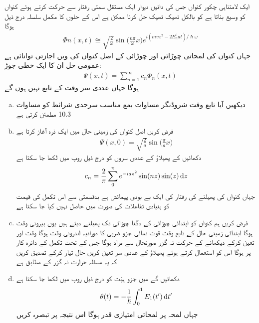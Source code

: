 ایک لامتناہی چکور کنواں جس کی دائیں دیوار ایک مستقل سمتی رفتار  سے حرکت کرتے ہوئے کنواں کو وسیع بناتا ہے کو بالکل ٹھیک ٹھیک حل کرنا ممکن ہے اس کے حلوں کا مکمل سلسلہ درج ذیل ہوگا 
\begin{align}
\Phi n (x, t) \cong \sqrt{\frac{2}{\omega}} \sin \big ( \frac{n \pi}{\omega} x \big ) e^{i(mvx^2 -2E_n^i at)/\hslash \omega}
\end{align}
جہاں  کنواں کی لمحاتی چوڑائی اور چوڑائی  کے اصل کنواں کی  ویں اجازتی توانائی  ہے عمومی حل ان  کا ایک خطی جوڑ:
\begin{align}
\Psi (x, t) = \sum_{n = 1}^{\infty} c_n \Phi_n (x, t)
\end{align}
ہوگا جہاں عددی سر  وقت  کے تابع نہیں ہوں گے 
\begin{enumerate}[a.]
\item
دیکھیں آیا تابع وقت شروڈنگر مساوات بمع مناسب سرحدی شرائط کو مساوات 10.3  مطمئن کرتی ہے 
\item
فرض کریں اصل کنواں کی زمینی حال میں ایک ذرہ آغاز   کرتا ہے  
\begin{align*}
\Psi (x, 0) = \sqrt{\frac{2}{a}} \sin \big ( \frac{\pi}{a} x \big )
\end{align*}
دکھائیں کے پھیلاؤ کے عددى سروں کو درج ذیل روپ میں لکھا جا سکتا ہے 
\begin{align}
c_n = \frac{2}{\pi} \sum_0^{\pi} e^{-iaz^2} \sin(nz) \sin(z) \dif z
\end{align}
جہاں 
کنواں کی پھیلنے کی رفتار کی ایک بے بودی پیمائش ہے بدقسمتی سے اس تکمل کی قیمت کو بنیادی تفاعلات کی صورت میں حاصل نہیں کیا جا سکتا ہے 
\item
فرض کریں ہم کنواں کو ابتدائی چوڑائی کے دگنا چوڑائی تک پھیلنے دیتے ہیں یوں بیرونی وقت  ہوگا ابتدائی زمینی حال کے تابع وقت قوت نمائی جزو ضربی کا دورانیہ اندرونی وقت ہوگا وقت  اور  تعین کرکے دیکھائے کے حرکت نہ گزر  صورتحال سے مراد  ہوگا جس کے تحت تکمل کے دائرہ کار پر  ہوگا اس کو استعمال کرتے ہوئے پھیلاؤ کے عددی سر  تعین کریں حال  تیار کرکے تصدیق کریں کہ یہ مسئلہ حرارت نہ گزر کے مطابق ہے 
\item
دکھائیں گے  میں جزو ہيّت کو درج ذیل روپ میں لکھا جا سکتا ہے 
\begin{align}
\theta (t) = - \frac{1}{\hslash} \int_0^1 E_1 (t') \dif t'
\end{align}
جہاں لمحہ  پر لمحاتی امتیازی قدر  ہوگا اس نتیجہ پر تبصرہ کریں 
\end{enumerate}

